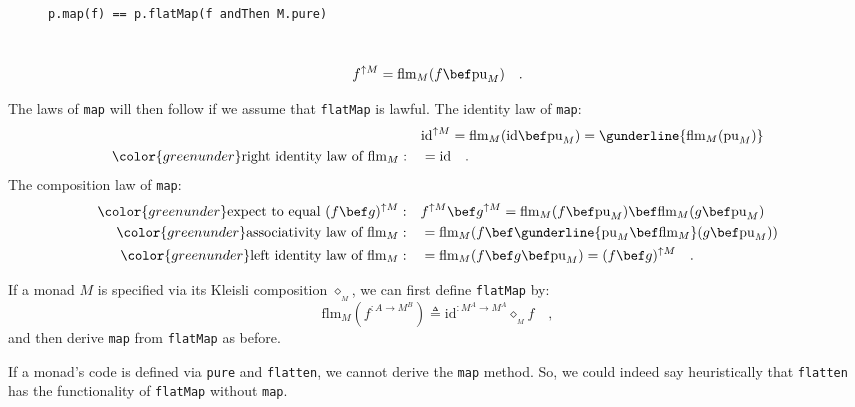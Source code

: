 \begin{wrapfigure}{l}{0.5\columnwidth}%
\vspace{-0.5\baselineskip}
\begin{lstlisting}
p.map(f) == p.flatMap(f andThen M.pure)
\end{lstlisting}

\vspace{-0.5\baselineskip}
\end{wrapfigure}%

~\vspace{-0.1\baselineskip}
\begin{equation}
f^{\uparrow M}=\text{flm}_{M}(f\bef\text{pu}_{M})\quad.\label{eq:express-map-through-flatMap}
\end{equation}

The laws of \lstinline!map! will then follow if we assume that \lstinline!flatMap!
is lawful. The identity law of \lstinline!map!:
\begin{align*}
 & \text{id}^{\uparrow M}=\text{flm}_{M}(\text{id}\bef\text{pu}_{M})=\gunderline{\text{flm}_{M}(\text{pu}_{M})}\\
{\color{greenunder}\text{right identity law of }\text{flm}_{M}:}\quad & =\text{id}\quad.
\end{align*}
The composition law of \lstinline!map!:
\begin{align*}
{\color{greenunder}\text{expect to equal }(f\bef g)^{\uparrow M}:}\quad & f^{\uparrow M}\bef g^{\uparrow M}=\text{flm}_{M}(f\bef\text{pu}_{M})\bef\text{flm}_{M}(g\bef\text{pu}_{M})\\
{\color{greenunder}\text{associativity law of }\text{flm}_{M}:}\quad & =\text{flm}_{M}(f\bef\gunderline{\text{pu}_{M}\bef\text{flm}_{M}}(g\bef\text{pu}_{M}))\\
{\color{greenunder}\text{left identity law of }\text{flm}_{M}:}\quad & =\text{flm}_{M}(f\bef g\bef\text{pu}_{M})=(f\bef g)^{\uparrow M}\quad.
\end{align*}

If a monad $M$ is specified via its Kleisli composition $\diamond_{_{M}}$,
we can first define \lstinline!flatMap! by:
\[
\text{flm}_{M}(f^{:A\rightarrow M^{B}})\triangleq\text{id}^{:M^{A}\rightarrow M^{A}}\diamond_{_{M}}f\quad,
\]
and then derive \lstinline!map! from \lstinline!flatMap! as before.

If a monad\textsf{'}s code is defined via \lstinline!pure! and \lstinline!flatten!,
we cannot derive the \lstinline!map! method. So, we could indeed
say heuristically that \lstinline!flatten! has the functionality
of \lstinline!flatMap! without \lstinline!map!.

